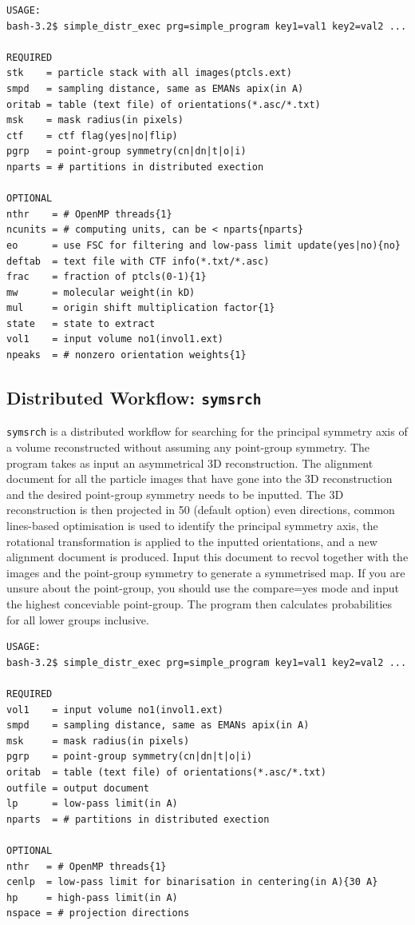 \documentclass[a4paper,11pt]{article}
\newcommand{\prgname}[1]{\textcolor{NavyBlue}{\texttt{#1}}}
\begin{document}
\begin{verbatim}
USAGE:
bash-3.2$ simple_distr_exec prg=simple_program key1=val1 key2=val2 ...

REQUIRED
stk    = particle stack with all images(ptcls.ext)
smpd   = sampling distance, same as EMANs apix(in A)
oritab = table (text file) of orientations(*.asc/*.txt)
msk    = mask radius(in pixels)
ctf    = ctf flag(yes|no|flip)
pgrp   = point-group symmetry(cn|dn|t|o|i)
nparts = # partitions in distributed exection

OPTIONAL
nthr    = # OpenMP threads{1}
ncunits = # computing units, can be < nparts{nparts}
eo      = use FSC for filtering and low-pass limit update(yes|no){no}
deftab  = text file with CTF info(*.txt/*.asc)
frac    = fraction of ptcls(0-1){1}
mw      = molecular weight(in kD)
mul     = origin shift multiplication factor{1}
state   = state to extract
vol1    = input volume no1(invol1.ext)
npeaks  = # nonzero orientation weights{1}
\end{verbatim}

\subsection{Distributed Workflow: \prgname{symsrch}}
\label{symsrch}
\prgname{symsrch} is a distributed workflow for searching for the principal symmetry axis of a volume reconstructed without assuming any point-group symmetry. The program takes as input an asymmetrical 3D reconstruction. The alignment document for all the particle images that have gone into the 3D reconstruction and the desired point-group symmetry needs to be inputted. The 3D reconstruction is then projected in 50 (default option) even directions, common lines-based optimisation is used to identify the principal symmetry axis, the rotational transformation is applied to the inputted orientations, and a new alignment document is produced. Input this document to recvol together with the images and the point-group symmetry to generate a symmetrised map. If you are unsure about the point-group, you should use the compare=yes mode and input the highest conceviable point-group. The program then calculates probabilities for all lower groups inclusive.

\begin{verbatim}
USAGE:
bash-3.2$ simple_distr_exec prg=simple_program key1=val1 key2=val2 ...

REQUIRED
vol1    = input volume no1(invol1.ext)
smpd    = sampling distance, same as EMANs apix(in A)
msk     = mask radius(in pixels)
pgrp    = point-group symmetry(cn|dn|t|o|i)
oritab  = table (text file) of orientations(*.asc/*.txt)
outfile = output document
lp      = low-pass limit(in A)
nparts  = # partitions in distributed exection

OPTIONAL
nthr   = # OpenMP threads{1}
cenlp  = low-pass limit for binarisation in centering(in A){30 A}
hp     = high-pass limit(in A)
nspace = # projection directions
\end{verbatim}
\end{document}
